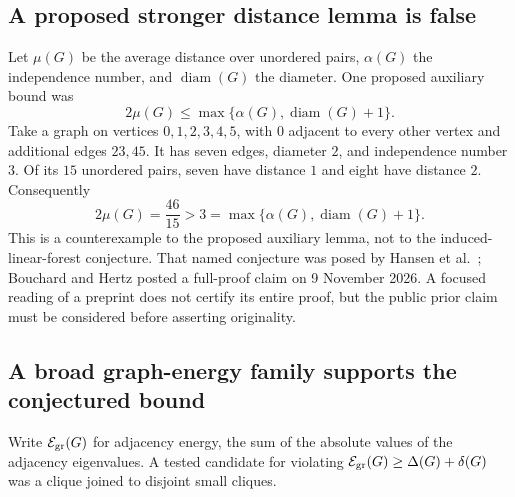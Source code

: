 \documentclass[11pt,a4paper]{article}
\theoremstyle{definition}
\theoremstyle{remark}\newtheorem{remark}[theorem]{Remark}
\begin{document}
\subsection{A proposed stronger distance lemma is false}

Let $\mu(G)$ be the average distance over unordered pairs,
$\alpha(G)$ the independence number, and $\operatorname{diam}(G)$
the diameter. One proposed auxiliary bound was
\[
 2\mu(G)\le\max\{\alpha(G),\operatorname{diam}(G)+1\}.
\]
Take a graph on vertices $0,1,2,3,4,5$, with $0$ adjacent to every
other vertex and additional edges $23,45$. It has seven edges,
diameter $2$, and independence number $3$. Of its $15$ unordered
pairs, seven have distance $1$ and eight have distance $2$.
Consequently
\[
 2\mu(G)=\frac{46}{15}>3
 =\max\{\alpha(G),\operatorname{diam}(G)+1\}.
\]
This is a counterexample to the proposed auxiliary lemma, not to
the induced-linear-forest conjecture. That named conjecture was
posed by Hansen et al.\ \cite{HHKMS}; Bouchard and Hertz
\cite{BH} posted a full-proof claim on 9 November 2026. A focused
reading of a preprint does not certify its entire proof, but the
public prior claim must be considered before asserting originality.

\subsection{A broad graph-energy family supports the conjectured bound}

Write $\mathcal{E}_{\rm gr}(G)$ for adjacency energy, the sum of the
absolute values of the adjacency eigenvalues. A tested candidate
for violating $\mathcal{E}_{\rm gr}(G)\ge\Delta(G)+\delta(G)$ was
a clique joined to disjoint small cliques.
\end{document}
